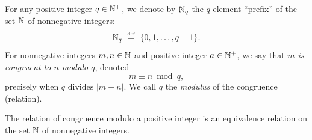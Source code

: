For any positive integer $q \in \mathbb{N}^+$, we denote by $\mathbb{N}_q$ the
$q$-element ``prefix'' of the set $\mathbb{N}$ of nonnegative integers:
\[ \mathbb{N}_q \ \stackrel{\mbox{{\tiny def}}}{=} \ \{0, 1, \ldots, q-1\} . \]
For nonnegative integers $m, n \in \mathbb{N}$ and positive integer $a \in
\mathbb{N}^+$, we say that {\em $m$ is congruent to $n$ modulo $q$},
  denoted
\[ m \equiv n \bmod q, \]
precisely when $q \mbox{ divides } |m-n|$.  We call $q$ the {\it
  modulus} of the congruence (relation).

\begin{prop}
\label{thm:CONGisEQUIVALENCE-REL}
The relation of congruence modulo a positive integer is an equivalence
relation on the set $\mathbb{N}$ of nonnegative integers.
\end{prop}

